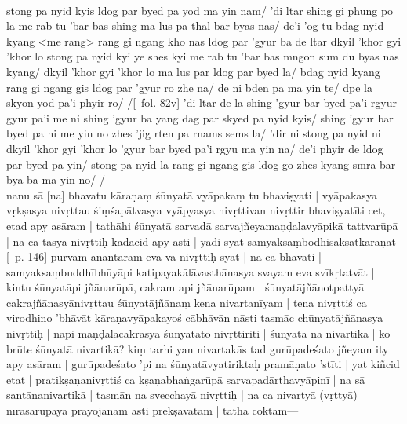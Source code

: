\documentclass[12pt]{article}
\newcommand{\emdash} {\hspace{0em}—\hspace{0em}}
\begin{document}
\textbf{\TVB}\\
stong pa nyid kyis ldog par byed pa yod ma yin nam/ 'di ltar shing gi phung po la me rab tu 'bar bas shing ma lus pa thal bar byas nas/ de'i 'og tu bdag nyid kyang <me rang> rang gi ngang kho nas ldog par 'gyur ba de ltar dkyil 'khor gyi 'khor lo stong pa nyid kyi ye shes kyi me rab tu 'bar bas mngon sum du byas nas kyang/ dkyil 'khor gyi 'khor lo ma lus par ldog par byed la/ bdag nyid kyang rang gi ngang gis ldog par 'gyur ro zhe na/ de ni bden pa ma yin te/ dpe la skyon yod pa'i phyir ro/ /[\TVB\ fol. 82v] 'di ltar de la shing 'gyur bar byed pa'i rgyur gyur pa'i me ni shing 'gyur ba yang dag par skyed pa nyid kyis/ shing 'gyur bar byed pa ni me yin no zhes 'jig rten pa rnams sems la/ 'dir ni stong pa nyid ni dkyil 'khor gyi 'khor lo 'gyur bar byed pa'i rgyu ma yin na/ de'i phyir de ldog par byed pa yin/ stong pa nyid la rang gi ngang gis ldog go zhes kyang smra bar bya ba ma yin no/ /\\

nanu sā [na] bhavatu kāraṇaṃ śūnyatā vyāpakaṃ tu bhaviṣyati | vyāpakasya vṛkṣasya nivṛttau śiṃśapātvasya vyāpyasya nivṛttivan nivṛttir bhaviṣyatīti cet, etad apy asāram | tathāhi śūnyatā sarvadā sarvajñeyamaṇḍalavyāpikā tattvarūpā | na ca tasyā nivṛttiḥ kadācid apy asti | yadi syāt samyaksaṃbodhisākṣātkaraṇāt [\EDD\ p. 146] pūrvam anantaram eva vā nivṛttiḥ syāt | na ca bhavati | samyaksaṃbuddhībhūyāpi katipayakālāvasthānasya svayam eva svīkṛtatvāt | kintu śūnyatāpi jñānarūpā, cakram api jñānarūpam | śūnyatājñānotpattyā cakrajñānasyānivṛttau śūnyatājñānaṃ kena nivartanīyam | tena nivṛttiś ca virodhino 'bhāvāt kāraṇavyāpakayoś cābhāvān nāsti tasmāc chūnyatājñānasya nivṛttiḥ | nāpi maṇḍalacakrasya śūnyatāto nivṛttiriti | śūnyatā na nivartikā | ko brūte śūnyatā nivartikā? kiṃ tarhi yan nivartakās tad gurūpadeśato jñeyam ity apy asāram | gurūpadeśato 'pi na śūnyatāvyatiriktaḥ pramāṇato 'stīti | yat kiñcid etat | pratikṣaṇanivṛttiś ca kṣaṇabhaṅgarūpā sarvapadārthavyāpinī | na sā santānanivartikā | tasmān na svecchayā nivṛttiḥ | na ca nivartyā (vṛttyā) nīrasarūpayā prayojanam asti prekṣāvatām | tathā coktam\emdash \\
\end{document}
